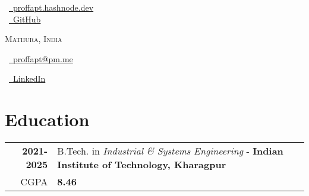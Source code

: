 \documentclass[a4paper,10pt]{extarticle} %
\begin{document}
\pagestyle{empty} %

\begin{multicols}{3}

\normalsize  \faGlobe\ {\href{https://proffapt.hashnode.dev/}{\  proffapt.hashnode.dev}}\\
\normalsize \faGithub\ {\href{https://github.com/proffapt}{\  GitHub}}\\
\columnbreak
\normalsize\par{\centering{\huge\textsc{\textcolor{primary}{Arpit Bhardwaj}}}\par} 
\par{\centering\normalsize {\textsc{Mathura, India}}\hfill\par}
\columnbreak
\raggedright\hfill\normalsize \faEnvelope\ {\href{mailto:proffapt@pm.me}{\  proffapt@pm.me}}\\
\raggedright\hfill\normalsize \faLinkedinSquare\ {\href{https://www.linkedin.com/in/proffapt}{\  LinkedIn}}\\
\end{multicols}
\vspace{-0.4 cm}

\section{\textcolor{primary}{Education}}
\vspace{+0.2cm}

\begin{tabular}{r|p{17.5cm}}	

 \textbf{2021-2025} & B.Tech. in \textit{Industrial \& Systems Engineering} - \textbf{Indian Institute of Technology, Kharagpur}\\
 \hfill CGPA & \textbf{8.46}\\
 
\end{tabular}

\vspace{+0.2cm}
\end{document}
